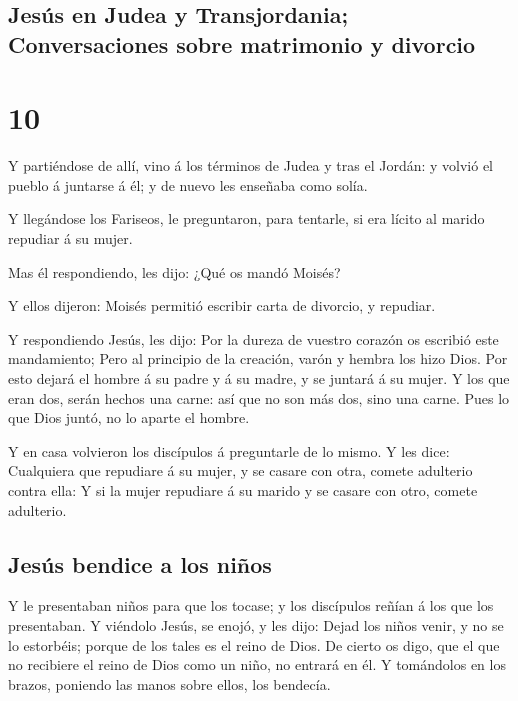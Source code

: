 \hypertarget{jesuxfas-en-judea-y-transjordania-conversaciones-sobre-matrimonio-y-divorcio}{%
\subsection{Jesús en Judea y Transjordania; Conversaciones sobre
matrimonio y
divorcio}\label{jesuxfas-en-judea-y-transjordania-conversaciones-sobre-matrimonio-y-divorcio}}

\hypertarget{section-41-10}{%
\section{10}\label{section-41-10}}

 Y partiéndose de allí, vino á los términos de Judea y
tras el Jordán: y volvió el pueblo á juntarse á él; y de nuevo les
enseñaba como solía.

 Y llegándose los Fariseos, le preguntaron, para tentarle,
si era lícito al marido repudiar á su mujer.

 Mas él respondiendo, les dijo: ¿Qué os mandó Moisés?

 Y ellos dijeron: Moisés permitió escribir carta de
divorcio, y repudiar.

 Y respondiendo Jesús, les dijo: Por la dureza de vuestro
corazón os escribió este mandamiento;  Pero al principio
de la creación, varón y hembra los hizo Dios.  Por esto
dejará el hombre á su padre y á su madre, y se juntará á su mujer.
 Y los que eran dos, serán hechos una carne: así que no
son más dos, sino una carne.  Pues lo que Dios juntó, no
lo aparte el hombre.

 Y en casa volvieron los discípulos á preguntarle de lo
mismo.  Y les dice: Cualquiera que repudiare á su mujer,
y se casare con otra, comete adulterio contra ella:  Y si
la mujer repudiare á su marido y se casare con otro, comete adulterio.

\hypertarget{jesuxfas-bendice-a-los-niuxf1os}{%
\subsection{Jesús bendice a los
niños}\label{jesuxfas-bendice-a-los-niuxf1os}}

 Y le presentaban niños para que los tocase; y los
discípulos reñían á los que los presentaban.  Y viéndolo
Jesús, se enojó, y les dijo: Dejad los niños venir, y no se lo
estorbéis; porque de los tales es el reino de Dios.  De
cierto os digo, que el que no recibiere el reino de Dios como un niño,
no entrará en él.  Y tomándolos en los brazos, poniendo
las manos sobre ellos, los bendecía.


